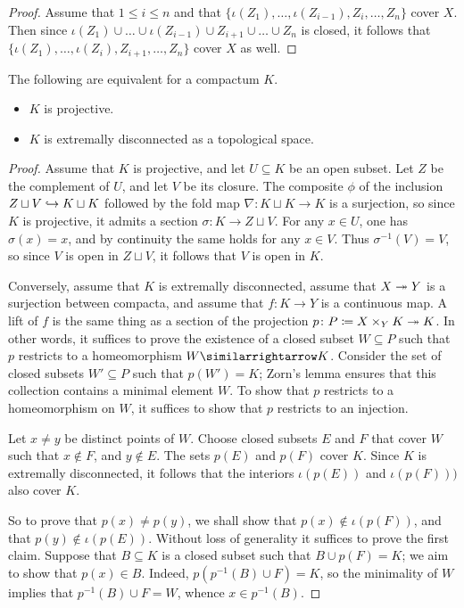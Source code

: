 \begin{proof}
	Assume that $ 1 \leq i \leq n $ and that $ \{ \iota(Z_1), \dots, \iota(Z_{i-1}), Z_i, \dots, Z_n \} $ cover $ X $.
	Then since $ \iota(Z_1) \cup \dots \cup \iota(Z_{i-1}) \cup Z_{i+1} \cup \dots \cup Z_n $ is closed, it follows that $ \{ \iota(Z_1), \dots, \iota(Z_i), Z_{i+1}, \dots, Z_n \} $ cover $ X $ as well.
\end{proof}

\begin{prp}
	The following are equivalent for a compactum $ K $.
	\begin{itemize}
		\item $ K $ is projective.
		\item $ K $ is extremally disconnected as a topological space.
	\end{itemize}
\end{prp}

\begin{proof}
	Assume that $ K $ is projective, and let $ U \subseteq K $ be an open subset.
	Let $ Z $ be the complement of $ U $, and let $ V $ be its closure.
	The composite $ \phi $ of the inclusion $ Z \sqcup V \hookrightarrow K \sqcup K $ followed by the fold map $ \nabla \colon K \sqcup K \to K $ is a surjection, so since $ K $ is projective, it admits a section $ \sigma \colon K \to Z \sqcup V $.
	For any $ x \in U $, one has $ \sigma(x) = x $, and by continuity the same holds for any $ x \in V $.
	Thus $ \sigma^{-1}(V) = V $, so since $ V $ is open in $ Z \sqcup V $, it follows that $ V $ is open in $ K $.

	Conversely, assume that $ K $ is extremally disconnected, assume that $ X \twoheadrightarrow Y $ is a surjection between compacta, and assume that $ f \colon K \to Y $ is a continuous map.
	A lift of $ f $ is the same thing as a section of the projection $ p \colon P \coloneq X \times_Y K \twoheadrightarrow K $.
	In other words, it suffices to prove the existence of a closed subset $ W \subseteq P $ such that $ p $ restricts to a homeomorphism $ W \equivalence K $.
	Consider the set of closed subsets $ W' \subseteq P $ such that $ p(W') = K $;
	Zorn's lemma ensures that this collection contains a minimal element $ W $.
	To show that $ p $ restricts to a homeomorphism on $ W $, it suffices to show that $ p $ restricts to an injection.

	Let $ x \neq y $ be distinct points of $ W $.
	Choose closed subsets $ E $ and $ F $ that cover $ W $ such that $ x \notin F $, and $ y \notin E $.
	The sets $ p(E) $ and $ p(F) $ cover $ K $.
	Since $ K $ is extremally disconnected, it follows that the interiors $ \iota(p(E)) $ and $ \iota(p(F))) $ also cover $ K $.

	So to prove that $ p(x) \neq p(y) $, we shall show that $ p(x) \notin \iota(p(F)) $, and that $ p(y) \notin \iota(p(E)) $.
	Without loss of generality it suffices to prove the first claim.
	Suppose that $ B \subseteq K $ is a closed subset such that $ B \cup p(F) = K $;
	we aim to show that $ p(x) \in B $.
	Indeed, $ p(p^{-1}(B) \cup F) = K $, so the minimality of $ W $ implies that $ p^{-1}(B) \cup F = W $, whence $ x \in p^{-1}(B) $.
\end{proof}
	

